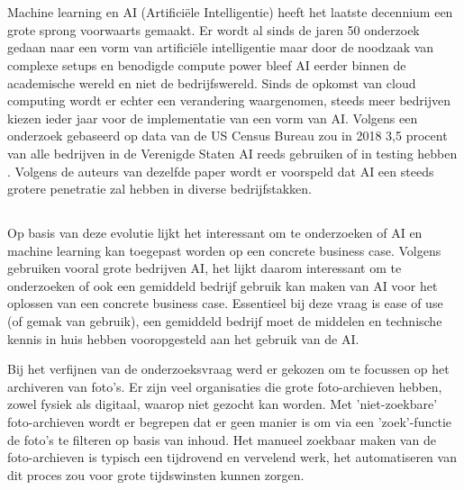
\chapter{}
\label{ch:inleiding}

Machine learning en AI (Artificiële Intelligentie) heeft het laatste decennium een grote sprong voorwaarts gemaakt. Er wordt al sinds de jaren 50 onderzoek gedaan naar een vorm van artificiële intelligentie maar door de noodzaak van complexe setups en benodigde compute power bleef AI eerder binnen de academische wereld en niet de bedrijfswereld. Sinds de opkomst van cloud computing wordt er echter een verandering waargenomen, steeds meer bedrijven kiezen ieder jaar voor de implementatie van een vorm van AI. Volgens een onderzoek gebaseerd op data van de US Census Bureau zou in 2018 3,5 procent van alle bedrijven in de Verenigde Staten AI reeds gebruiken of in testing hebben \autocite{Zolas2020}. Volgens de auteurs van dezelfde paper wordt er voorspeld dat AI een steeds grotere penetratie zal hebben in diverse bedrijfstakken.

\section{}
\label{sec:probleemstelling}
Op basis van deze evolutie lijkt het interessant om te onderzoeken of AI en machine learning kan toegepast worden op een concrete business case. Volgens \textcite{Zolas2020} gebruiken vooral grote bedrijven AI, het lijkt daarom interessant om te onderzoeken of ook een gemiddeld bedrijf gebruik kan maken van AI voor het oplossen van een concrete business case. Essentieel bij deze vraag is ease of use (of gemak van gebruik), een gemiddeld bedrijf moet de middelen en technische kennis in huis hebben vooropgesteld aan het gebruik van de AI. 

Bij het verfijnen van de onderzoeksvraag werd er gekozen om te focussen op het archiveren van foto's. Er zijn veel organisaties die grote foto-archieven hebben, zowel fysiek als digitaal, waarop niet gezocht kan worden. Met 'niet-zoekbare' foto-archieven wordt er begrepen dat er geen manier is om via een 'zoek'-functie de foto's te filteren op basis van inhoud. Het manueel zoekbaar maken van de foto-archieven is typisch een tijdrovend en vervelend werk, het automatiseren van dit proces zou voor grote tijdswinsten kunnen zorgen.

